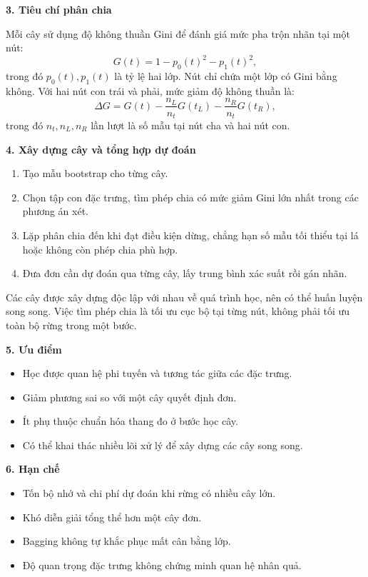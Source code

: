 \documentclass[a4paper]{article}
\begin{document}
\noindent\textbf{3. Tiêu chí phân chia}\par
Mỗi cây sử dụng độ không thuần Gini để đánh giá mức pha trộn nhãn tại một nút:
\[
G(t)=1-p_0(t)^2-p_1(t)^2,
\]
trong đó $p_0(t),p_1(t)$ là tỷ lệ hai lớp. Nút chỉ chứa một lớp có Gini bằng không. Với hai nút con trái và phải, mức giảm độ không thuần là:
\[
\Delta G=G(t)-\frac{n_L}{n_t}G(t_L)-\frac{n_R}{n_t}G(t_R),
\]
trong đó $n_t,n_L,n_R$ lần lượt là số mẫu tại nút cha và hai nút con.

\noindent\textbf{4. Xây dựng cây và tổng hợp dự đoán}\par
\begin{enumerate}
    \item Tạo mẫu bootstrap cho từng cây.
    \item Chọn tập con đặc trưng, tìm phép chia có mức giảm Gini lớn nhất trong các phương án xét.
    \item Lặp phân chia đến khi đạt điều kiện dừng, chẳng hạn số mẫu tối thiểu tại lá hoặc không còn phép chia phù hợp.
    \item Đưa đơn cần dự đoán qua từng cây, lấy trung bình xác suất rồi gán nhãn.
\end{enumerate}
Các cây được xây dựng độc lập với nhau về quá trình học, nên có thể huấn luyện song song. Việc tìm phép chia là tối ưu cục bộ tại từng nút, không phải tối ưu toàn bộ rừng trong một bước.

\noindent\textbf{5. Ưu điểm}\par
\begin{itemize}
    \item Học được quan hệ phi tuyến và tương tác giữa các đặc trưng.
    \item Giảm phương sai so với một cây quyết định đơn.
    \item Ít phụ thuộc chuẩn hóa thang đo ở bước học cây.
    \item Có thể khai thác nhiều lõi xử lý để xây dựng các cây song song.
\end{itemize}

\noindent\textbf{6. Hạn chế}\par
\begin{itemize}
    \item Tốn bộ nhớ và chi phí dự đoán khi rừng có nhiều cây lớn.
    \item Khó diễn giải tổng thể hơn một cây đơn.
    \item Bagging không tự khắc phục mất cân bằng lớp.
    \item Độ quan trọng đặc trưng không chứng minh quan hệ nhân quả.
\end{itemize}
\end{document}
